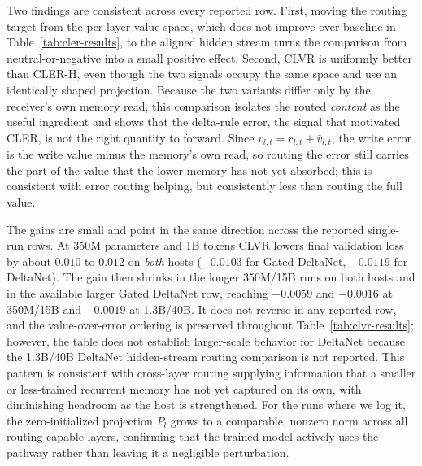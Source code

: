 \documentclass{article}
\begin{document}
Two findings are consistent across every reported row. First, moving the routing target from the per-layer value space, which does not improve over baseline in Table~\ref{tab:cler-results}, to the aligned hidden stream turns the comparison from neutral-or-negative into a small positive effect. Second, CLVR is uniformly better than CLER-H, even though the two signals occupy the same space and use an identically shaped projection. Because the two variants differ only by the receiver's own memory read, this comparison isolates the routed \emph{content} as the useful ingredient and shows that the delta-rule error, the signal that motivated CLER, is not the right quantity to forward. Since $v_{l,t}=r_{l,t}+\bar v_{l,t}$, the write error is the write value minus the memory's own read, so routing the error still carries the part of the value that the lower memory has not yet absorbed; this is consistent with error routing helping, but consistently less than routing the full value.

The gains are small and point in the same direction across the reported single-run rows. At 350M parameters and 1B tokens CLVR lowers final validation loss by about $0.010$ to $0.012$ on \emph{both} hosts ($-0.0103$ for Gated DeltaNet, $-0.0119$ for DeltaNet). The gain then shrinks in the longer 350M/15B runs on both hosts and in the available larger Gated DeltaNet row, reaching $-0.0059$ and $-0.0016$ at 350M/15B and $-0.0019$ at 1.3B/40B. It does not reverse in any reported row, and the value-over-error ordering is preserved throughout Table~\ref{tab:clvr-results}; however, the table does not establish larger-scale behavior for DeltaNet because the 1.3B/40B DeltaNet hidden-stream routing comparison is not reported. This pattern is consistent with cross-layer routing supplying information that a smaller or less-trained recurrent memory has not yet captured on its own, with diminishing headroom as the host is strengthened. For the runs where we log it, the zero-initialized projection $P_l$ grows to a comparable, nonzero norm across all routing-capable layers, confirming that the trained model actively uses the pathway rather than leaving it a negligible perturbation.
\end{document}
